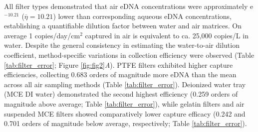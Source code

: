 \documentclass{article}
\begin{document}
All filter types demonstrated that air eDNA concentrations were approximately e$^{-10.21}$ ($\overline \eta = 10.21$) lower than corresponding aqueous eDNA concentrations, establishing a quantifiable dilution factor between water and air matrices. On average 1 copies/day/cm$^2$ captured in air is equivalent to ca. 25,000 copies/L in water. Despite the general consistency in estimating the water-to-air dilution coefficient, method-specific variations in collection efficiency were observed (Table \ref{tab:filter_error}; Figure \ref{fig:fig2}\textit{A}). PTFE filters exhibited higher capture efficiencies, collecting 0.683 orders of magnitude more eDNA than the mean across all air sampling methods (Table \ref{tab:filter_error}). Deionized water tray (MCE DI water) demonstrated the second highest efficiency (0.259 orders of magnitude above average; Table \ref{tab:filter_error}), while gelatin filters and air suspended MCE filters showed comparatively lower capture efficacy (0.242 and 0.701 orders of magnitude below average, respectively; Table \ref{tab:filter_error}).
\end{document}
